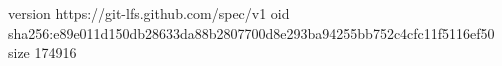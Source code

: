 version https://git-lfs.github.com/spec/v1
oid sha256:e89e011d150db28633da88b2807700d8e293ba94255bb752c4cfc11f5116ef50
size 174916
